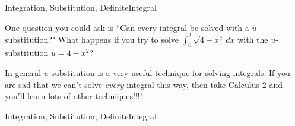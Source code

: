 \begin{tagblock}{Integration, Substitution, DefiniteIntegral}
\begin{question}

One question you could ask is ``Can every integral be solved with a $u$-substitution?"  What happens if you try to solve $\displaystyle \int_0^2 \sqrt{4-x^2} \, dx$ with the $u$-substitution $u=4-x^2$?

\vspace{.5in}
In general $u$-substitution is a very useful technique for solving integrals.  If you are sad that we can't solve \emph{every} integral this way, then take Calculus 2 and you'll learn lots of other techniques!!!!



	
	
\begin{tags}
	  Integration, Substitution, DefiniteIntegral
\end{tags}
	
\begin{diary}
	   
\end{diary}
	
\begin{solution}
	   
	    \end{enumerate}
\end{solution}
	
\end{question}

\end{tagblock}

